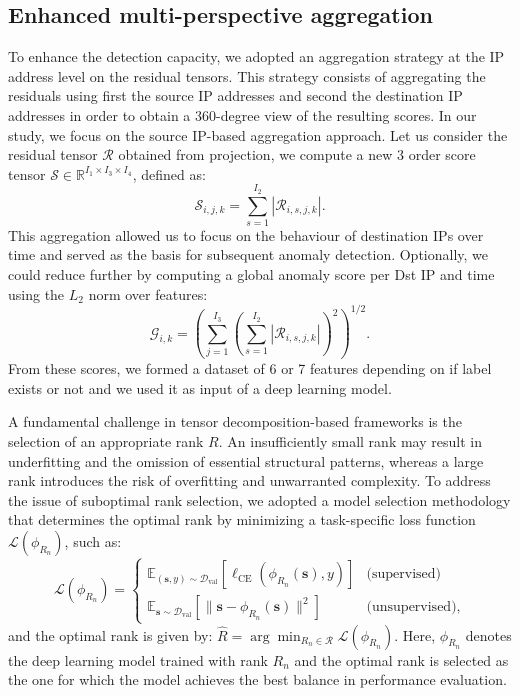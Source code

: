 \documentclass[preprint,12pt,authoryear]{elsarticle}
\begin{document}
\subsection{Enhanced multi-perspective aggregation}

To enhance the detection capacity, we adopted an aggregation strategy at the IP address level on the residual tensors. This strategy consists of aggregating the residuals using first the source IP addresses and second the destination IP addresses in order to obtain a 360-degree view of the resulting scores. In our study, we focus on the source IP-based aggregation approach. Let us consider the residual tensor \(\mathcal{R}\) obtained from projection, we compute a new 3 order score tensor \(\mathcal{S} \in \mathbb{R}^{I_1 \times I_3 \times I_4}\), defined as:
\begin{equation}
    \mathcal{S}_{i, j, k} = \sum_{s=1}^{I_2} |\mathcal{R}_{i, s, j, k}|.
\end{equation}
\noindent This aggregation allowed us to focus on the behaviour of destination IPs over time and served as the basis for subsequent anomaly detection. Optionally, we could reduce further by computing a global anomaly score per Dst IP and time using the \(L_2\) norm over features:
\[
\mathcal{G}_{i,k} = \left( \sum_{j=1}^{I_3} \left( \sum_{s=1}^{I_2} |\mathcal{R}_{i, s, j, k}| \right)^2 \right)^{1/2}.
\]
\noindent From these scores, we formed a dataset of 6 or 7 features depending on if label exists or not and we used it as input of a deep learning model.

A fundamental challenge in tensor decomposition-based frameworks is the selection of an appropriate rank \(R\). An insufficiently small rank may result in underfitting and the omission of essential structural patterns, whereas a large rank introduces the risk of overfitting and unwarranted complexity. To address the issue of suboptimal rank selection, we adopted a model selection methodology that determines the optimal rank by minimizing a task-specific loss function \( \mathcal{L}(\phi_{R_n}) \), such as:
\[
    \mathcal{L}(\phi_{R_n}) = 
    \begin{cases}
        \mathbb{E}_{(\mathbf{s}, y) \sim \mathcal{D}_{\text{val}}} \left[ \ell_{\text{CE}}\left(\phi_{R_n}(\mathbf{s}), y \right) \right] & \text{(supervised)} \\
        \mathbb{E}_{\mathbf{s} \sim \mathcal{D}_{\text{val}}} \left[ \|\mathbf{s} - \phi_{R_n}(\mathbf{s})\|^2 \right] & \text{(unsupervised)},
    \end{cases}
\]
and the optimal rank is given by: 
\(
    \hat{R} = \arg\min_{R_n \in \mathcal{R}} \mathcal{L}(\phi_{R_n}). 
\)  Here, \(\phi_{R_n}\) 
denotes the deep learning model trained with rank \(R_n\)
and the optimal rank is selected as the one for which the model achieves the best balance in performance evaluation.   
\end{document}
